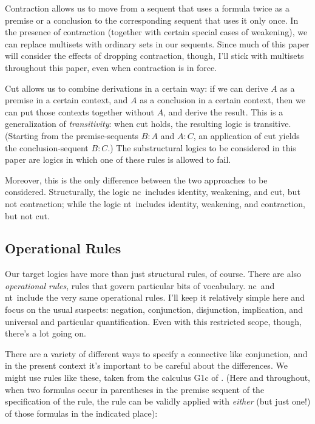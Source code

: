 \documentclass{ergoclass}
\newcommand{\sqq}[2]{\ensuremath{#1  \mathrel{:}  #2}}
\newcommand{\nclog}{{\sc nc}}
\newcommand{\ntlog}{{\sc nt}}
\renewcommand{\cite}{\citet}						%
\begin{document}
Contraction allows us to move from a sequent that uses a formula twice as a premise or a conclusion to the corresponding sequent that uses it only once. In the presence of contraction (together with certain special cases of weakening), we can replace multisets with ordinary sets in our sequents. Since much of this paper will consider the effects of dropping contraction, though, I'll stick with multisets throughout this paper, even when contraction is in force.

Cut allows us to combine derivations in a certain way: if we can derive $A$ as a premise in a certain context, and $A$ as a conclusion in a certain context, then we can put those contexts together without $A$, and derive the result. This is a generalization of {\em transitivity}: when cut holds, the resulting logic is transitive. (Starting from the premise-sequents $\sqq{B}{A}$ and $\sqq{A}{C}$, an application of cut yields the conclusion-sequent $\sqq{B}{C}$.) The substructural logics to be considered in this paper are logics in which one of these rules is allowed to fail.

Moreover, this is the only difference between the two approaches to be considered. Structurally, the logic \nclog\ includes identity, weakening, and cut, but not contraction; while the logic \ntlog\ includes identity, weakening, and contraction, but not cut. 

\subsection{Operational Rules}

Our target logics have more than just structural rules, of course. There are also {\em operational rules}, rules that govern particular bits of vocabulary.  \nclog\ and \ntlog\ include the very same operational rules. I'll keep it relatively simple here and focus on the usual suspects: negation, conjunction, disjunction, implication, and universal and particular quantification. Even with this restricted scope, though, there's a lot going on.

There are a variety of different ways to specify a connective like conjunction, and in the present context it's important to be careful about the differences. We might use rules like these, taken from the calculus G1c of \cite{ts:bpt}. (Here and throughout, when two formulas occur in parentheses in the premise sequent of the specification of the rule, the rule can be validly applied with {\em either} (but just one!) of those formulas in the indicated place):
\end{document}
